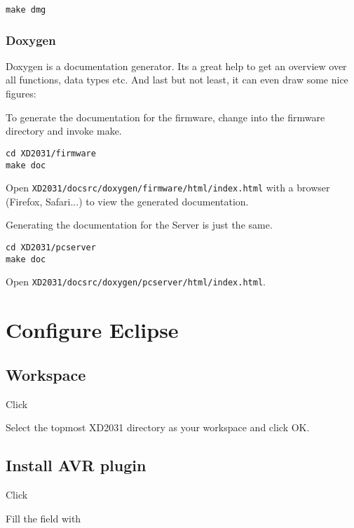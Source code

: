 \begin{verbatim}
make dmg
\end{verbatim}


\clearpage
\subsubsection{Doxygen}
Doxygen is a documentation generator. Its a great help to get
an overview over all functions, data types etc. And last but not least,
it can even draw some nice figures:

To generate the documentation for the firmware, change into the firmware
directory and invoke make. 

\begin{verbatim}
cd XD2031/firmware
make doc
\end{verbatim}

Open \texttt{XD2031/docsrc/doxygen/firmware/html/index.html}
with a browser (Firefox, Safari...) to view the generated documentation.

Generating the documentation for the Server is just the same.

\begin{verbatim}
cd XD2031/pcserver
make doc
\end{verbatim}

Open \texttt{XD2031/docsrc/doxygen/pcserver/html/index.html}.


\clearpage
\section{Configure Eclipse}
\subsection{Workspace}
Click 

Select the topmost XD2031 directory as your workspace and click OK.


\clearpage
\subsection{Install AVR plugin}
Click 

Fill the field  with 

